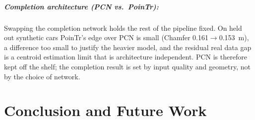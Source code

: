 \documentclass[a4paper,12pt]{report}
\begin{document}
\paragraph{Completion architecture (PCN vs.\ PoinTr):} Swapping the completion network
holds the rest of the pipeline fixed. On held out synthetic cars PoinTr's edge over PCN is
small (Chamfer \SI{0.161}{}$\to$\SI{0.153}{\meter}), a difference too small to justify the
heavier model, and the residual real data gap is a centroid estimation limit that is
architecture independent. PCN is therefore kept off the shelf; the completion result is set
by input quality and geometry, not by the choice of network.
%
%
%
\chapter{Conclusion and Future Work}
\label{ch:conclusion}
\end{document}
